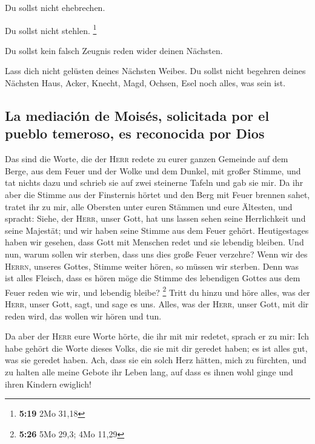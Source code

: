  Du sollst nicht ehebrechen.

 Du sollst nicht stehlen. \footnote{\textbf{5:19} 2Mo
  31,18}

 Du sollst kein falsch Zeugnis reden wider deinen
Nächsten.

 Lass dich nicht gelüsten deines Nächsten Weibes. Du
sollst nicht begehren deines Nächsten Haus, Acker, Knecht, Magd, Ochsen,
Esel noch alles, was sein ist.

\hypertarget{la-mediaciuxf3n-de-moisuxe9s-solicitada-por-el-pueblo-temeroso-es-reconocida-por-dios}{%
\subsection{La mediación de Moisés, solicitada por el pueblo temeroso,
es reconocida por
Dios}\label{la-mediaciuxf3n-de-moisuxe9s-solicitada-por-el-pueblo-temeroso-es-reconocida-por-dios}}

 Das sind die Worte, die der \textsc{Herr} redete zu
eurer ganzen Gemeinde auf dem Berge, aus dem Feuer und der Wolke und dem
Dunkel, mit großer Stimme, und tat nichts dazu und schrieb sie auf zwei
steinerne Tafeln und gab sie mir.  Da ihr aber die Stimme
aus der Finsternis hörtet und den Berg mit Feuer brennen sahet, tratet
ihr zu mir, alle Obersten unter euren Stämmen und eure Ältesten,
 und spracht: Siehe, der \textsc{Herr}, unser Gott, hat
uns lassen sehen seine Herrlichkeit und seine Majestät; und wir haben
seine Stimme aus dem Feuer gehört. Heutigestages haben wir gesehen, dass
Gott mit Menschen redet und sie lebendig bleiben.  Und
nun, warum sollen wir sterben, dass uns dies große Feuer verzehre? Wenn
wir des \textsc{Herrn}, unseres Gottes, Stimme weiter hören, so müssen
wir sterben.  Denn was ist alles Fleisch, dass es hören
möge die Stimme des lebendigen Gottes aus dem Feuer reden wie wir, und
lebendig bleibe? \footnote{\textbf{5:26} 5Mo 29,3; 4Mo 11,29}
 Tritt du hinzu und höre alles, was der \textsc{Herr},
unser Gott, sagt, und sage es uns. Alles, was der \textsc{Herr}, unser
Gott, mit dir reden wird, das wollen wir hören und tun.

 Da aber der \textsc{Herr} eure Worte hörte, die ihr mit
mir redetet, sprach er zu mir: Ich habe gehört die Worte dieses Volks,
die sie mit dir geredet haben; es ist alles gut, was sie geredet haben.
 Ach, dass sie ein solch Herz hätten, mich zu fürchten,
und zu halten alle meine Gebote ihr Leben lang, auf dass es ihnen wohl
ginge und ihren Kindern ewiglich!

